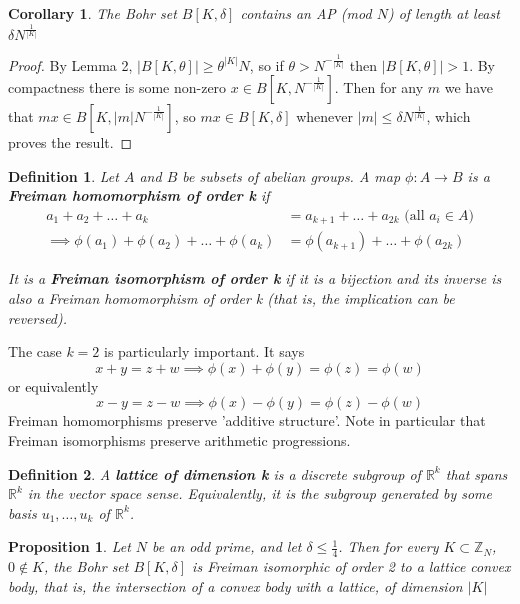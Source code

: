 \documentclass[a4paper]{article}
\newtheorem*{definition}{Definition}
\newtheorem{corollary}[lemma]{Corollary}
\newtheorem{prop}[lemma]{Proposition}
\newcommand*\abs[1]{\left|#1\right|}
\begin{document}
\begin{corollary}
	The Bohr set $B[K, \delta]$ contains an AP (mod $N$) of length at least $\delta N ^{\frac{1}{\abs{K}}}$
\end{corollary}
\begin{proof}
	By Lemma 2, $\abs{B[K, \theta]} \geq \theta^{\abs{K}}N$, so if $\theta > N^{-\frac{1}{\abs{K}}}$ then $\abs{B[K, \theta]} > 1$. By compactness there is some non-zero $x \in B[K, N^{-\frac{1}{\abs{K}}}]$. Then for any $m$ we have that $mx \in B[K, \abs{m}N^{-\frac{1}{\abs{K}}}]$, so $mx \in B[K, \delta]$ whenever $\abs{m} \leq \delta N^{\frac{1}{\abs{K}}}$, which proves the result.
\end{proof}

\begin{definition}
	Let $A$ and $B$ be subsets of abelian groups. A map $\phi:A \to B$ is a \textbf{Freiman homomorphism of order k} if
	\begin{align*}
		a_1 + a_2 + \dots + a_k &= a_{k+1} + \dots + a_{2k} \text{ (all $a_i \in A$)} \\
		\implies \phi(a_1) + \phi(a_2) + \dots + \phi(a_k) &= \phi(a_{k+1}) + \dots + \phi(a_{2k})
	\end{align*}
	
	It is a \textbf{Freiman isomorphism of order k} if it is a bijection and its inverse is also a Freiman homomorphism of order k (that is, the implication can be reversed).
\end{definition}

The case $k=2$ is particularly important. It says $$x+y = z+w \implies \phi(x)+ \phi(y) = \phi(z) = \phi(w)$$ or equivalently $$x-y=z-w \implies \phi(x)-\phi(y) = \phi(z)-\phi(w)$$
Freiman homomorphisms preserve 'additive structure'. Note in particular that Freiman isomorphisms preserve arithmetic progressions.


\begin{definition}
	A \textbf{lattice of dimension k} is a discrete subgroup of $\mathbb{R}^k$ that spans $\mathbb{R}^k$ in the vector space sense. Equivalently, it is the subgroup generated by some basis $u_1,\dots,u_k$ of $\mathbb{R}^k$.
\end{definition}

\begin{prop}
	Let $N$ be an odd prime, and let $\delta \leq \frac{1}{4}$.
	Then for every $K \subset \mathbb{Z}_N$, $0 \not\in K$,
	the Bohr set $B[K, \delta]$ is Freiman isomorphic of order 2 to a lattice convex body,
	that is, the intersection of a convex body with a lattice,
	of dimension $\abs{K}$
\end{prop}
\end{document}
